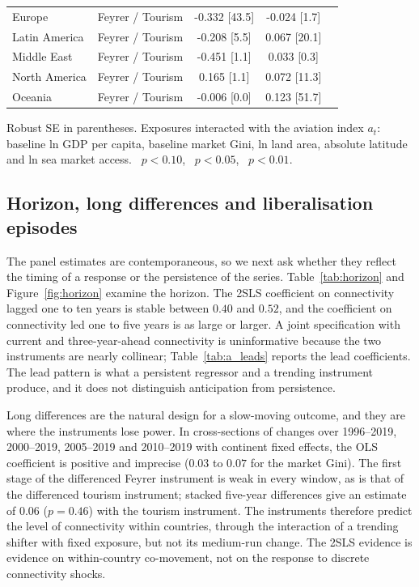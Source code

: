 \begin{table}[H]
\begin{threeparttable}
\begin{tabular}{lcccc}
Europe & Feyrer / Tourism & -0.332\sym{***} [43.5] & -0.024 [1.7] & \\
Latin America & Feyrer / Tourism & -0.208\sym{**} [5.5] & 0.067\sym{***} [20.1] & \\
Middle East & Feyrer / Tourism & -0.451 [1.1] & 0.033 [0.3] & \\
North America & Feyrer / Tourism & 0.165 [1.1] & 0.072\sym{***} [11.3] & \\
Oceania & Feyrer / Tourism & -0.006 [0.0] & 0.123\sym{***} [51.7] & \\
\bottomrule
\end{tabular}
\begin{tablenotes}\footnotesize\item Robust SE in parentheses. Exposures interacted with the aviation index $a_t$: baseline ln GDP per capita, baseline market Gini, ln land area, absolute latitude and ln sea market access. \sym{*}~$p<0.10$, \sym{**}~$p<0.05$, \sym{***}~$p<0.01$.\end{tablenotes}\end{threeparttable}\end{table}

\subsection{Horizon, long differences and liberalisation episodes}
\label{sec:horizon}
The panel estimates are contemporaneous, so we next ask whether they reflect the timing of a response or the persistence of the series. Table~\ref{tab:horizon} and Figure~\ref{fig:horizon} examine the horizon. The 2SLS coefficient on connectivity lagged one to ten years is stable between $0.40$ and $0.52$, and the coefficient on connectivity led one to five years is as large or larger. A joint specification with current and three-year-ahead connectivity is uninformative because the two instruments are nearly collinear; Table~\ref{tab:a_leads} reports the lead coefficients. The lead pattern is what a persistent regressor and a trending instrument produce, and it does not distinguish anticipation from persistence.

Long differences are the natural design for a slow-moving outcome, and they are where the instruments lose power. In cross-sections of changes over 1996--2019, 2000--2019, 2005--2019 and 2010--2019 with continent fixed effects, the OLS coefficient is positive and imprecise ($0.03$ to $0.07$ for the market Gini). The first stage of the differenced Feyrer instrument is weak in every window, as is that of the differenced tourism instrument; stacked five-year differences give an estimate of $0.06$ ($p=0.46$) with the tourism instrument. The instruments therefore predict the level of connectivity within countries, through the interaction of a trending shifter with fixed exposure, but not its medium-run change. The 2SLS evidence is evidence on within-country co-movement, not on the response to discrete connectivity shocks.

